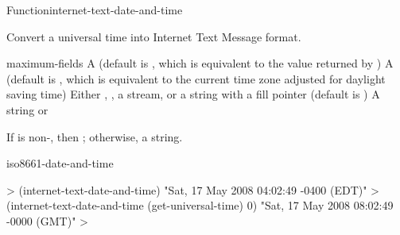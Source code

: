\documentclass[10pt,twoside,english,pdftex]{article}
\begin{document}
\begin{functiondoc}{Function}{internet-text-date-and-time}{%
      
    \returns{} }
% 

\fnsyntax

\fnpurpose Convert a universal time into Internet Text Message format.

\fnpackage {}

\fnmodule {}

\fnargs
\begin{args}{maximum-fields}
 A  (default is \nil,
  which is equivalent to the value returned by
  )
 A  (default is \nil,
  which is equivalent to the current time zone adjusted for daylight
  saving time)
\arg[destination] Either \nil, , a stream, or a string with a fill 
pointer (default is \nil)
\arg[result] A string or \nil{}
\end{args}

\fnreturns If  is non-\nil, then \nil; otherwise, a string.

\begin{alsos}{iso8661-date-and-time}
\end{alsos}

\fnexamples
%
\W\supp
\begin{example}
  > (internet-text-date-and-time)
  "Sat, 17 May 2008 04:02:49 -0400 (EDT)"
  > (internet-text-date-and-time (get-universal-time) 0)
  "Sat, 17 May 2008 08:02:49 -0000 (GMT)"
  >
\end{example}

\end{functiondoc}

\end{document}
